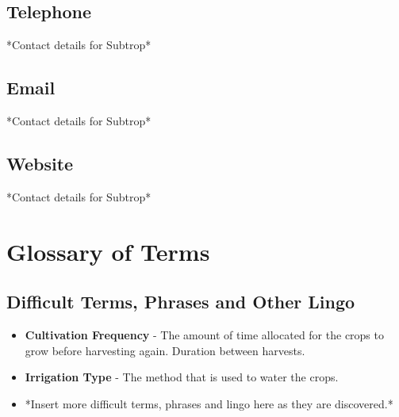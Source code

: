 \documentclass[11pt,fleqn]{book} %
\begin{document}
	\section{Telephone}
		*Contact details for Subtrop*
	\section{Email}
		*Contact details for Subtrop*
	\section{Website}
		*Contact details for Subtrop*



\chapter{Glossary of Terms}
	\section{Difficult Terms, Phrases and Other Lingo}
		\begin{itemize}
			\item \textbf{Cultivation Frequency} - The amount of time allocated for the crops to grow before harvesting again. Duration between harvests.
			\item \textbf{Irrigation Type} - The method that is used to water the crops.
			\item *Insert more difficult terms, phrases and lingo here as they are discovered.*
		\end{itemize}
\end{document}
